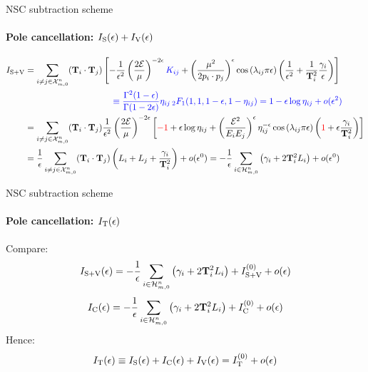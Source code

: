\begin{frame}{NSC subtraction scheme}
  \framesubtitle{Pole cancellation: $ I_\text{S}(\epsilon) + I_\text{V}(\epsilon) $}

  \small
  \begin{equation*}
    \begin{split}
      \isvo
      & = \sum_{i \neq j \in \fsp{n}{m}} (\cc) \left[ - \frac{1}{\de^2} \left( \frac{2\ema}{\mu} \right)^{-2\de} \textcolor{blue}{K_{ij}} + \left( \frac{\mu^2}{2p_i \cdot p_j} \right)^\de \cos \left( \lambda_{ij} \pi \de \right) \left( \frac{1}{\de^2} + \frac{1}{\tco_i^2} \frac{\gamma_i}{\de} \right) \right] \\
      & \qquad \qquad \qquad \qquad \qquad \textcolor{blue}{\equiv \frac{\Gamma^2(1-\de)}{\Gamma(1-2\de)} \eta_{ij} \,\hyp(1,1,1-\de,1-\eta_{ij}) = 1 - \de \log \eta_{ij} + \smo(\de^2)} \\
      & = \sum_{i \neq j \in \fsp{n}{m}} (\cc) \frac{1}{\de^2} \left( \frac{2\ema}{\mu} \right)^{-2\de} \left[ \textcolor{red}{-1} + \de \log \eta_{ij} + \left( \frac{\ema^2}{E_i E_j} \right)^\de \eta_{ij}^{-\de} \cos \left( \lambda_{ij} \pi \de \right) \left( \textcolor{red}{1} + \de \frac{\gamma_i}{\tco_i^2} \right) \right] \\ %
      & = \frac{1}{\de} \sum_{i \neq j \in \fsp{n}{m}} (\cc) \left( \leg_i + \leg_j + \frac{\gamma_i}{\tco_i^2} \right) + \smo(\de^0) = - \frac{1}{\de} \sum_{i \in \prt{n}{m}} \left( \gamma_i + 2 \tco_i^2 \leg_i \right) + \smo(\de^0)
    \end{split}
  \end{equation*}

\end{frame}


\begin{frame}{NSC subtraction scheme}
  \framesubtitle{Pole cancellation: $ I_\text{T}(\epsilon) $}

  Compare:
  \begin{equation*}
    I_{\text{S}+\text{V}}(\epsilon) = - \frac{1}{\epsilon} \sum_{i \in \mathcal{H}^{n}_{m,0}} \left( \gamma_i + 2 \mathbf{T}_i^2 L_i \right) + I_{\text{S}+\text{V}}^{(0)} + o(\epsilon)
  \end{equation*}
  \begin{equation*}
    I_\text{C}(\epsilon) =  - \frac{1}{\epsilon} \sum_{i \in \mathcal{H}^{n}_{m,0}} \left( \gamma_i + 2 \mathbf{T}_i^2 L_i \right) + I_\text{C}^{(0)} + o(\epsilon)
  \end{equation*}
  Hence:
  \begin{equation*}
    I_\text{T}(\epsilon) \equiv I_\text{S}(\epsilon) + I_\text{C}(\epsilon) + I_\text{V}(\epsilon) = I_\text{T}^{(0)} + o(\epsilon)
  \end{equation*}

\end{frame}

